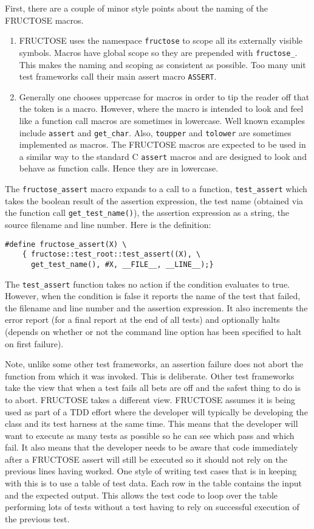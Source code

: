 \documentclass{book}
\begin{document}
First, there are a couple of minor style points
about the naming of the FRUCTOSE macros.
\begin{enumerate}
\item FRUCTOSE uses the namespace {\tt fructose} to scope all its externally
visible symbols. Macros have global scope so they are prepended with
{\tt fructose\_}. This makes the naming and scoping as consistent as possible.
Too many unit test frameworks call their main assert macro {\tt ASSERT}.

\item Generally one chooses uppercase for macros in order to tip the reader
off that the token is a macro. However, where the macro is intended to look
and feel like a function call macros are sometimes in lowercase. 
Well known examples include {\tt assert} and {\tt get\_char}. 
Also, {\tt toupper} and {\tt tolower} are sometimes implemented as macros.
The FRUCTOSE macros are expected to be used in a similar way to the standard
C {\tt assert} macros and are designed to look and behave as function calls.
Hence they are in lowercase.
\end{enumerate}

The {\tt fructose\_assert} macro expands to a call to a function,
{\tt test\_assert} which takes the boolean result of the assertion expression,
the test name (obtained via the function call {\tt get\_test\_name()}),
the assertion expression as a string, 
the source filename and line number.
Here is the definition:

\begin{verbatim}
#define fructose_assert(X) \
    { fructose::test_root::test_assert((X), \
      get_test_name(), #X, __FILE__, __LINE__);}
\end{verbatim}

The {\tt test\_assert} function takes no action if the condition
evaluates to true. However, when the condition is false
it reports the name of the test that failed, the filename and line number
and the assertion expression. It also increments the error report (for a final
report at the end of all tests) and optionally halts (depends on whether or
not the command line option has been specified to halt on first failure).

Note, unlike some other test frameworks, an assertion failure does not
abort the function from which it was invoked.
This is deliberate. Other test frameworks take the view that when
a test fails all bets are off and the safest thing to do is to abort.
FRUCTOSE takes a different view. FRUCTOSE assumes it is being used as part
of a TDD effort where the developer will typically be developing the
class and its test harness at the same time. This means that the developer
will want to execute as many tests as possible so he can see which pass
and which fail. It also means that the developer needs to be aware
that code immediately after a FRUCTOSE assert will still be executed
so it should not rely on the previous lines having worked.
One style of writing test cases that is in keeping with this is to 
use a table of test data. Each row in the table contains the input and
the expected output. This allows the test code to loop over the table
performing lots of tests without a test having to rely on
successful execution of the previous test.
\end{document}
